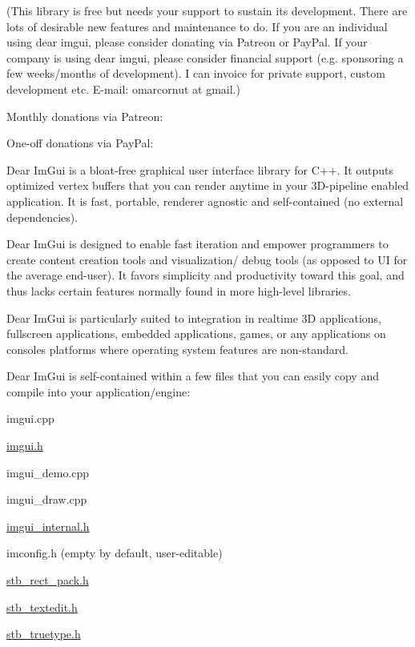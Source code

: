 \href{https://travis-ci.org/ocornut/imgui}{\tt } \href{https://scan.coverity.com/projects/4720}{\tt }

(This library is free but needs your support to sustain its development. There are lots of desirable new features and maintenance to do. If you are an individual using dear imgui, please consider donating via Patreon or Pay\+Pal. If your company is using dear imgui, please consider financial support (e.\+g. sponsoring a few weeks/months of development). I can invoice for private support, custom development etc. E-\/mail\+: omarcornut at gmail.)

Monthly donations via Patreon\+: ~\newline
\href{http://www.patreon.com/imgui}{\tt }

One-\/off donations via Pay\+Pal\+: ~\newline
\href{https://www.paypal.com/cgi-bin/webscr?cmd=_s-xclick&hosted_button_id=5Q73FPZ9C526U}{\tt }

Dear Im\+Gui is a bloat-\/free graphical user interface library for C++. It outputs optimized vertex buffers that you can render anytime in your 3\+D-\/pipeline enabled application. It is fast, portable, renderer agnostic and self-\/contained (no external dependencies).

Dear Im\+Gui is designed to enable fast iteration and empower programmers to create content creation tools and visualization/ debug tools (as opposed to UI for the average end-\/user). It favors simplicity and productivity toward this goal, and thus lacks certain features normally found in more high-\/level libraries.

Dear Im\+Gui is particularly suited to integration in realtime 3D applications, fullscreen applications, embedded applications, games, or any applications on consoles platforms where operating system features are non-\/standard.

Dear Im\+Gui is self-\/contained within a few files that you can easily copy and compile into your application/engine\+:


\begin{DoxyItemize}
\item imgui.\+cpp
\item \hyperlink{imgui_8h_source}{imgui.\+h}
\item imgui\+\_\+demo.\+cpp
\item imgui\+\_\+draw.\+cpp
\item \hyperlink{imgui__internal_8h_source}{imgui\+\_\+internal.\+h}
\item imconfig.\+h (empty by default, user-\/editable)
\item \hyperlink{stb__rect__pack_8h_source}{stb\+\_\+rect\+\_\+pack.\+h}
\item \hyperlink{stb__textedit_8h_source}{stb\+\_\+textedit.\+h}
\item \hyperlink{stb__truetype_8h_source}{stb\+\_\+truetype.\+h}
\end{DoxyItemize}

